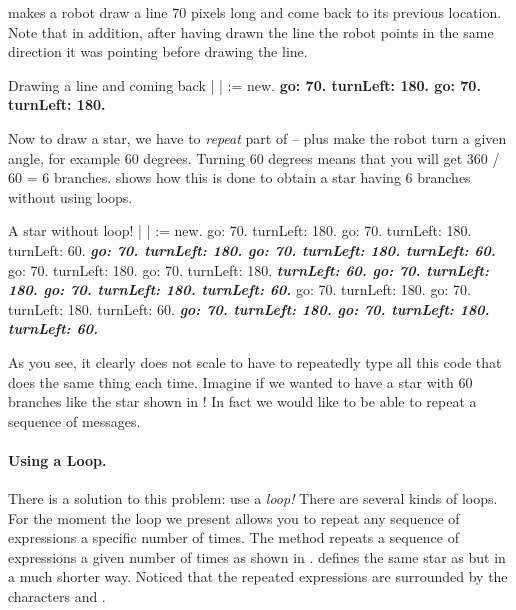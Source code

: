  makes a robot draw a line 70 pixels long and come back to its previous location. Note that in addition, after having drawn the line the robot points in the same direction it was pointing before drawing the line.

\begin{scriptwithtitle}{Drawing a line and coming back}\label{scr:line}
| \caro |
\caro := \Turtle new.
\textbf{\caro go: 70.
\caro turnLeft: 180.
\caro go: 70.
\caro turnLeft: 180.}
\end{scriptwithtitle}


Now to draw a star, we have to \emph{repeat} part of   -- plus make the robot turn a given angle, for example 60 degrees. Turning 60 degrees means that you will get 360 / 60 = 6 branches.  shows how this is done to obtain a star having 6 branches without using loops.


\begin{scriptwithtitle}{A star without loop!}\label{scr:star}
| \caro |
\caro := \Turtle new.
\caro go: 70.
\caro turnLeft: 180.
\caro go: 70.
\caro turnLeft: 180.
\caro turnLeft: 60. 
\textit{\textbf{\caro go: 70.
\caro turnLeft: 180.
\caro go: 70.
\caro turnLeft: 180.
\caro turnLeft: 60.}}
\caro go: 70.
\caro turnLeft: 180.
\caro go: 70.
\caro turnLeft: 180.
\textit{\textbf{\caro turnLeft: 60. 
\caro go: 70.
\caro turnLeft: 180.
\caro go: 70.
\caro turnLeft: 180.
\caro turnLeft: 60.}}
\caro go: 70.
\caro turnLeft: 180.
\caro go: 70.
\caro turnLeft: 180.
\caro turnLeft: 60. 
\textit{\textbf{\caro go: 70.
\caro turnLeft: 180.
\caro go: 70.
\caro turnLeft: 180.
\caro turnLeft: 60.}}
\end{scriptwithtitle}

As you see, it clearly does not scale to have to repeatedly type all this code that
does  the same thing each time. Imagine if we wanted to have a
star with 60 branches like the star shown in ! In fact we would like to be able to repeat a sequence of messages.

\paragraph{Using a  Loop.} There is a solution to this problem: use a \emph{loop!} There are several kinds of loops. For the moment the loop we present allows you to repeat any sequence of expressions a specific number of times. The method \timesRepeat  {} repeats a sequence of  expressions a given number of times as shown in  .  defines the same star as  but in a much shorter way. Noticed that the repeated expressions are surrounded by the characters \ct{[} and \ct{]}.

